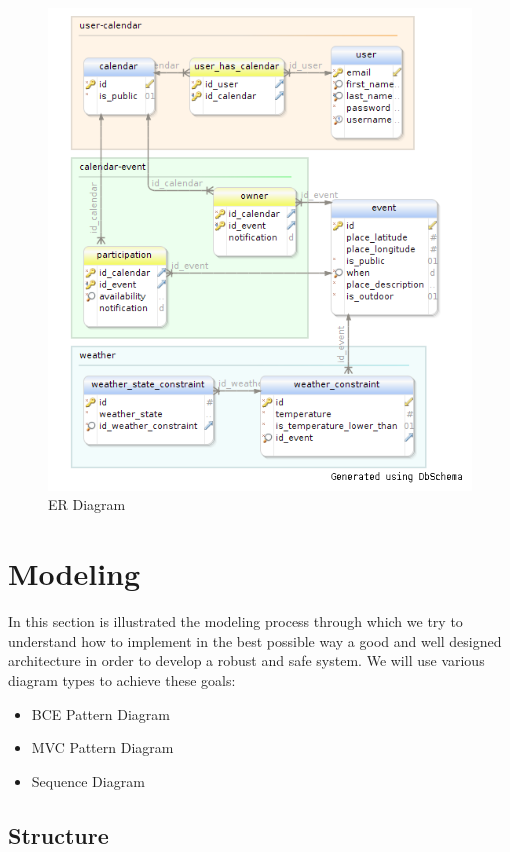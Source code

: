  \begin{center}
 \begin{figure}[H]
    \includegraphics[width=1\textwidth]{../ERDiagram/er/er.png}
    \caption{ER Diagram}
     \label{fig:er}
     \end{figure}
   \end{center}  
\section{Modeling}
In this section is illustrated the modeling process through which we try to understand how to implement in the best possible way a good and well designed architecture in order to develop a robust and safe system. We will use various diagram types to achieve these goals: \begin{itemize}
\item BCE Pattern Diagram
\item MVC Pattern Diagram
\item Sequence Diagram
\end{itemize}
\subsection{Structure}
